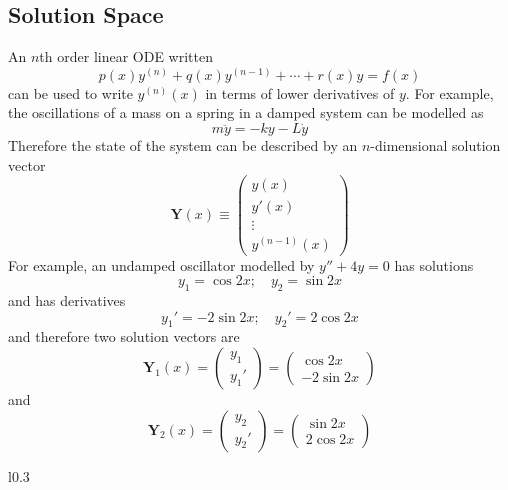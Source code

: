 \documentclass{article}
\begin{document}
	\subsection{Solution Space}
	An $n$th order linear ODE written
	\[ p(x)y^{(n)} + q(x) y^{(n-1)} + \cdots + r(x)y = f(x) \]
	can be used to write $y^{(n)}(x)$ in terms of lower derivatives of $y$. For example, the oscillations of a mass on a spring in a damped system can be modelled as
	\[ m\ddot y = -k y - L\dot y \]
	Therefore the state of the system can be described by an $n$-dimensional solution vector
	\begin{equation}
		\bm Y(x) \equiv \begin{pmatrix}
			y(x) \\ y'(x) \\ \vdots \\ y^{(n-1)}(x)
		\end{pmatrix}
	\end{equation}
	For example, an undamped oscillator modelled by $y'' + 4y = 0$ has solutions
	\[ y_1 = \cos 2x;\quad y_2 = \sin 2x \]
	and has derivatives
	\[ y_1' = -2\sin 2x;\quad y_2' = 2\cos 2x \]
	and therefore two solution vectors are
	\[
		\bm Y_1(x) = \begin{pmatrix}
			y_1 \\ y_1'
		\end{pmatrix} = \begin{pmatrix}
			\cos 2x \\ -2 \sin 2x
		\end{pmatrix}
	\]
	and
	\[
		\bm Y_2(x) = \begin{pmatrix}
			y_2 \\ y_2'
		\end{pmatrix} = \begin{pmatrix}
			\sin 2x \\ 2 \cos 2x
		\end{pmatrix}
	\]
	
	\begin{wrapfigure}{l}{0.3\textwidth}
	\end{wrapfigure}
\end{document}
